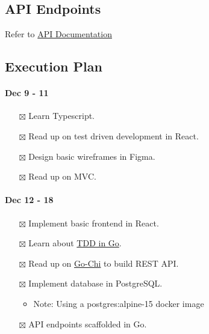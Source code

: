\documentclass[10pt]{exam}
\providecommand{\tightlist}{%
  \setlength{\itemsep}{0pt}\setlength{\parskip}{0pt}}
\begin{document}
\hypertarget{api-endpoints}{%
\subsection{API Endpoints}\label{api-endpoints}}

Refer to
\href{https://github.com/minreiseah/cvwo-assignment/tree/main/api/API.md}{API Documentation}

\hypertarget{execution-plan}{%
\subsection{Execution Plan}\label{execution-plan}}

\hypertarget{dec-9---11}{%
\paragraph{Dec 9 - 11}\label{dec-9---11}}

\begin{itemize}
\tightlist
\item[$\boxtimes$]
  Learn Typescript.
\item[$\boxtimes$]
  Read up on test driven development in React.
\item[$\boxtimes$]
  Design basic wireframes in Figma.
\item[$\boxtimes$]
  Read up on MVC.
\end{itemize}

\hypertarget{dec-12---18}{%
\paragraph{Dec 12 - 18}\label{dec-12---18}}

\begin{itemize}
\tightlist
\item[$\boxtimes$]
  Implement basic frontend in React.
\item[$\boxtimes$]
  Learn about \href{https://quii.gitbook.io/learn-go-with-tests/}{TDD in
  Go}.
\item[$\boxtimes$]
  Read up on \href{https://go-chi.io/\#/README}{Go-Chi} to build REST
  API.
\item[$\boxtimes$]
  Implement database in PostgreSQL.

  \begin{itemize}
  \tightlist
  \item
    Note: Using a postgres:alpine-15 docker image
  \end{itemize}
\item[$\boxtimes$]
  API endpoints scaffolded in Go.
\end{itemize}
\end{document}
